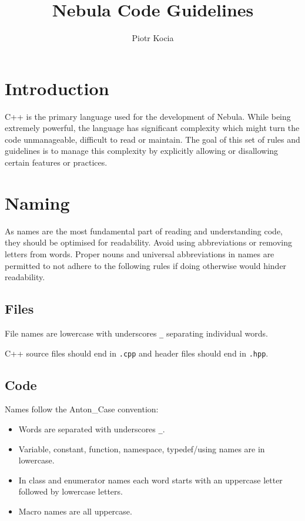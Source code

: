 \documentclass[12pt, a4paper]{article}
\title{Nebula Code Guidelines}
\author{Piotr Kocia}
\date{}
\newenvironment{itemlist}
{
\vspace{-0.5\topsep}
\begin{itemize}
  \setlength{\itemsep}{4pt}
  \setlength{\parskip}{0pt}
} {
\end{itemize}
\vspace{-0.5\topsep}
}
\newcommand{\code}[1]{\texttt{#1}}
\begin{document}
\maketitle

\tableofcontents
{}

\pagebreak


\section{Introduction}
C++ is the primary language used for the development of Nebula. While being
extremely powerful, the language has significant complexity which might turn the
code unmanageable, difficult to read or maintain. The goal of this set of rules
and guidelines is to manage this complexity by explicitly allowing or
disallowing certain features or practices.

\section{Naming}
As names are the most fundamental part of reading and understanding code, they
should be optimised for readability. Avoid using abbreviations or removing
letters from words. Proper nouns and universal abbreviations in names are
permitted to not adhere to the following rules if doing otherwise would hinder
readability.

\subsection{Files}
File names are lowercase with underscores \code{\_} separating individual words.

C++ source files should end in \code{.cpp} and header files should end in
\code{.hpp}.

\subsection{Code}
Names follow the Anton\_Case convention:
\begin{itemlist}
  \item Words are separated with underscores \code{\_}.
  \item Variable, constant, function, namespace, typedef/using names are in
  lowercase.
  \item In class and enumerator names each word starts with an uppercase letter
  followed by lowercase letters.
  \item Macro names are all uppercase.
\end{itemlist}
\end{document}
